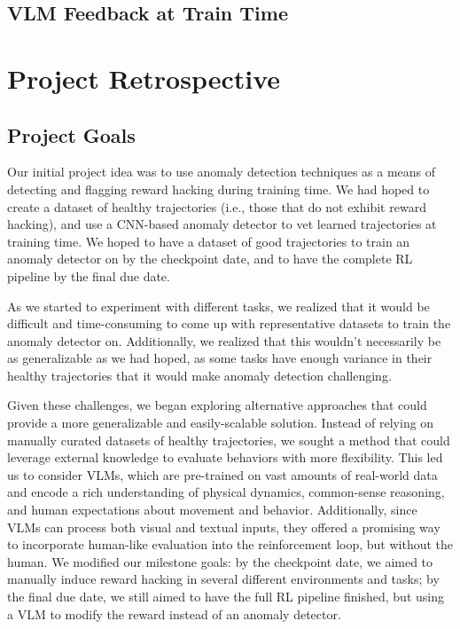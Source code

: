 \documentclass{article}
\begin{document}
\subsection{VLM Feedback at Train Time}


\section{Project Retrospective}
\subsection{Project Goals}
Our initial project idea was to use anomaly detection techniques as a means of detecting and flagging reward hacking during training time. We had hoped to create a dataset of healthy trajectories (i.e., those that do not exhibit reward hacking), and use a CNN-based anomaly detector to vet learned trajectories at training time. We hoped to have a dataset of good trajectories to train an anomaly detector on by the checkpoint date, and to have the complete RL pipeline by the final due date.

As we started to experiment with different tasks, we realized that it would be difficult and time-consuming to come up with representative datasets to train the anomaly detector on. Additionally, we realized that this wouldn't necessarily be as generalizable as we had hoped, as some tasks have enough variance in their healthy trajectories that it would make anomaly detection challenging. 

Given these challenges, we began exploring alternative approaches that could provide a more generalizable and easily-scalable solution. Instead of relying on manually curated datasets of healthy trajectories, we sought a method that could leverage external knowledge to evaluate behaviors with more flexibility. This led us to consider VLMs, which are pre-trained on vast amounts of real-world data and encode a rich understanding of physical dynamics, common-sense reasoning, and human expectations about movement and behavior. Additionally, since VLMs can process both visual and textual inputs, they offered a promising way to incorporate human-like evaluation into the reinforcement loop, but without the human. We modified our milestone goals: by the checkpoint date, we aimed to manually induce reward hacking in several different environments and tasks; by the final due date, we still aimed to have the full RL pipeline finished, but using a VLM to modify the reward instead of an anomaly detector.
\end{document}
